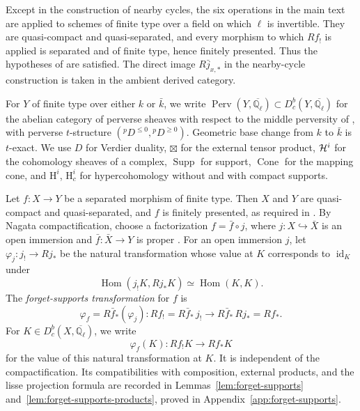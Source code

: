 \documentclass[12pt,reqno]{amsart}
\theoremstyle{definition}
\theoremstyle{plain}
\theoremstyle{definition}
\theoremstyle{remark}
\newcommand{\bbQ}{\mathbb{Q}}  \newcommand{\bbR}{\mathbb{R}}
\newcommand{\HH}{\mathrm{H}}  \newcommand{\JJ}{\mathrm{J}}
\newcommand{\ol}[1]{\overline{#1}}
\newcommand{\Ql}{\bbQ_{\ell}}
\newcommand{\Db}{D^b_c}
\newcommand{\Perv}{\operatorname{Perv}}
\newcommand{\Supp}{\operatorname{Supp}}
\newcommand{\Cone}{\operatorname{Cone}}
\begin{document}
Except in the construction of nearby cycles, the six operations in the main text are applied to schemes
of finite type over a field on which \(\ell\) is invertible.  They are quasi-compact and
quasi-separated, and every morphism to which \(Rf_!\) is applied is separated and of finite type,
hence finitely presented.  Thus the hypotheses of \cite[\S6.7, Rem.~6.8.15]{BhattScholze2015} are
satisfied.  The direct image \(R\bar j_{x,*}\) in the nearby-cycle construction is taken in the ambient
derived category.

For \(Y\) of finite type over either \(k\) or \(\bar k\), we write
\(\Perv(Y,\ol\Ql)\subset\Db(Y,\ol\Ql)\) for the abelian category of perverse sheaves with respect to the
middle perversity of \cite{BBDG18}, with perverse \(t\)-structure
\(({}^pD^{\le0},{}^pD^{\ge0})\).  Geometric base change from \(k\) to \(\bar k\) is \(t\)-exact.  We use
\(D\) for Verdier duality, \(\boxtimes\) for the external tensor product, \(\mathcal{H}^i\) for the cohomology
sheaves of a complex, \(\Supp\) for support, \(\Cone\) for the mapping cone, and \(\HH^i\), \(\HH^i_c\)
for hypercohomology without and with compact supports.

Let \(f\colon X\to Y\) be a separated morphism of finite type.  Then \(X\) and \(Y\) are quasi-compact
and quasi-separated, and \(f\) is finitely presented, as required in
\cite[Def.~6.7.6]{BhattScholze2015}.  By Nagata compactification, choose a factorization
\(f=\bar f\circ j\), where
\(j\colon X\hookrightarrow\bar X\) is an open immersion and \(\bar f\colon\bar X\to Y\) is proper
\cite[Tag~0F41]{stacks-project}.  For an open immersion \(j\), let \(\varphi_j\colon j_!\to Rj_*\) be the
natural transformation whose value at \(K\) corresponds to \(\operatorname{id}_K\) under
\[
        \operatorname{Hom}(j_!K,Rj_*K)\simeq\operatorname{Hom}(K,K).
\]
The \emph{forget-supports transformation} for \(f\) is
\begin{equation}
\label{eq:forget-supports}
        \varphi_f=R\bar f_*(\varphi_j)\colon
        Rf_!=R\bar f_*\,j_!\longrightarrow R\bar f_*\,Rj_*=Rf_*.
\end{equation}
For \(K\in\Db(X,\ol\Ql)\), we write
\[
        \varphi_f(K)\colon Rf_!K\longrightarrow Rf_*K
\]
for the value of this natural transformation at \(K\).
It is independent of the compactification.  Its compatibilities with composition, external products, and
the lisse projection formula are recorded in Lemmas~\ref{lem:forget-supports}
and~\ref{lem:forget-supports-products}, proved in Appendix~\ref{app:forget-supports}.
\end{document}
